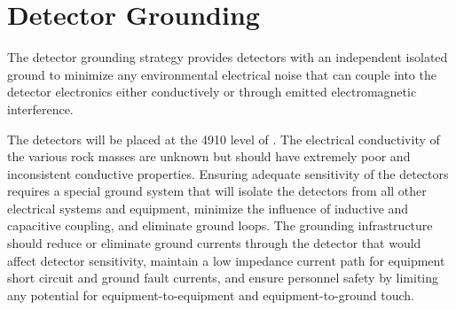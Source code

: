 \section{Detector Grounding}
\label{sec:fdsp-coord-faci-grounding}


The detector grounding strategy provides detectors with an independent
isolated ground to minimize any environmental electrical noise that
can couple into the detector electronics either conductively or
through emitted electromagnetic interference.

The detectors will be placed at the 4910 level of \surf. The
electrical conductivity of the various rock masses are unknown but
should have extremely poor and inconsistent conductive
properties. Ensuring adequate sensitivity of the detectors requires a
special ground system that will isolate the detectors from all other
electrical systems and equipment, minimize the influence of inductive
and capacitive coupling, and eliminate ground loops. The grounding
infrastructure should reduce or eliminate ground currents through the
detector that would affect detector sensitivity, maintain a low
impedance current path for equipment short circuit and ground fault
currents, and ensure personnel safety by limiting any potential for
equipment-to-equipment and equipment-to-ground touch.


